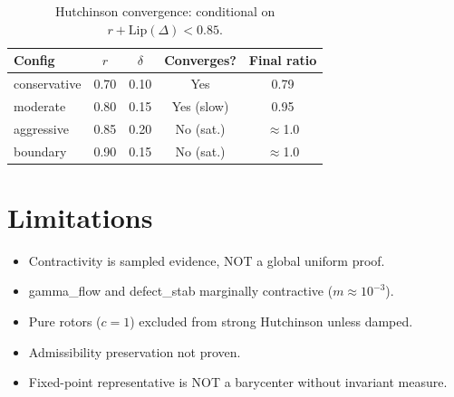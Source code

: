 \documentclass[11pt,a4paper]{article}
\begin{document}
\begin{table}[h]\centering
\begin{tabular}{lcccc}
\toprule
Config & $r$ & $\delta$ & Converges? & Final ratio \\
\midrule
conservative & 0.70 & 0.10 & Yes & 0.79 \\
moderate & 0.80 & 0.15 & Yes (slow) & 0.95 \\
aggressive & 0.85 & 0.20 & No (sat.) & $\approx$1.0 \\
boundary & 0.90 & 0.15 & No (sat.) & $\approx$1.0 \\
\bottomrule
\end{tabular}
\caption{Hutchinson convergence: conditional on $r + \mathrm{Lip}(\Delta) < 0.85$.}
\end{table}

\section{Limitations}
\begin{itemize}
  \item Contractivity is sampled evidence, NOT a global uniform proof.
  \item gamma\_flow and defect\_stab marginally contractive ($m \approx 10^{-3}$).
  \item Pure rotors ($c = 1$) excluded from strong Hutchinson unless damped.
  \item Admissibility preservation not proven.
  \item Fixed-point representative is NOT a barycenter without invariant measure.
\end{itemize}



\end{document}
